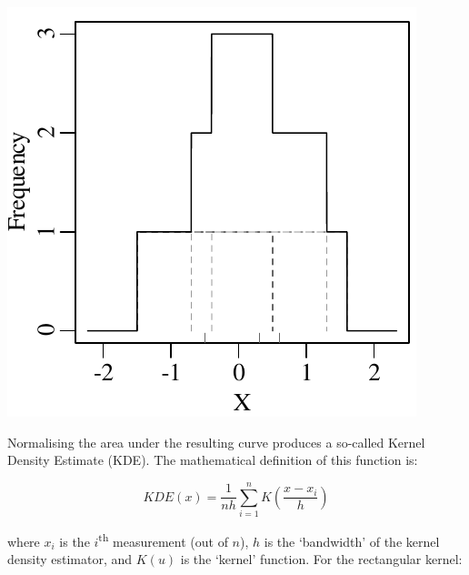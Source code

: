 \noindent\begin{minipage}[t][][b]{.3\textwidth}
  \includegraphics[width=\textwidth]{../figures/rectKDE.pdf}
\end{minipage}
\begin{minipage}[t][][t]{.7\textwidth}
  \label{fig:rectangles}
\end{minipage}

Normalising the area under the resulting curve produces a so-called
Kernel Density Estimate (KDE). The mathematical definition of this
function is:

\begin{equation}
  KDE(x) = \frac{1}{nh} \sum\limits_{i=1}^{n} K\!\left(\frac{x-x_i}{h}\right)
\end{equation}

\noindent where $x_i$ is the $i$\textsuperscript{th} measurement (out
of $n$), $h$ is the `bandwidth' of the kernel density estimator, and
$K(u)$ is the `kernel' function. For the rectangular kernel:

